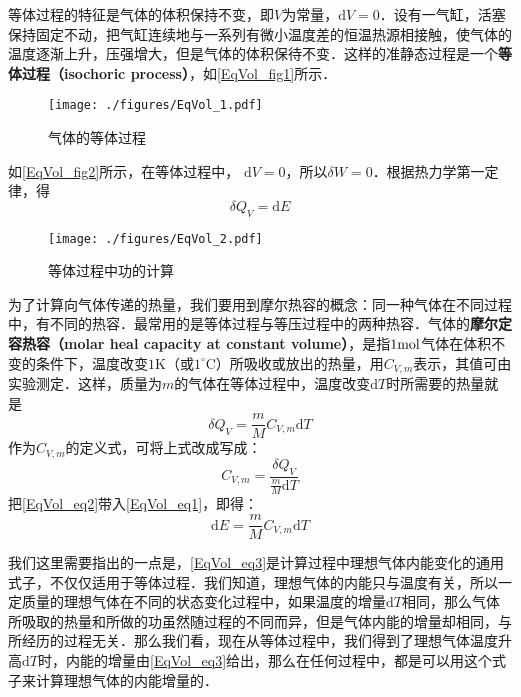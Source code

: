 

等体过程的特征是气体的体积保持不变，即$V $为常量，$\mathrm dV=0$．设有一气缸，活塞保持固定不动，把气缸连续地与一系列有微小温度差的恒温热源相接触，使气体的温度逐渐上升，压强增大，但是气体的体积保待不变．这样的准静态过程是一个\textbf{等体过程（isochoric process）}，如\autoref{EqVol_fig1}所示．
\begin{figure}[ht]
\centering
\texttt{[image: ./figures/EqVol\_1.pdf]}
\caption{气体的等体过程} \label{EqVol_fig1}
\end{figure}
如\autoref{EqVol_fig2}所示，在等体过程中， $\mathrm dV=0$，所以$\delta W=0$．根据热力学第一定律，得
\begin{equation} \label{EqVol_eq1}
\delta Q_{V}=\mathrm{d} E
\end{equation}
\begin{figure}[ht]
\centering
\texttt{[image: ./figures/EqVol\_2.pdf]}
\caption{等体过程中功的计算} \label{EqVol_fig2}
\end{figure}
为了计算向气体传递的热量，我们要用到摩尔热容的概念：同一种气体在不同过程中，有不同的热容．最常用的是等体过程与等压过程中的两种热容．气体的\textbf{摩尔定容热容（molar heal capacity at constant volume）}，是指$1 \rm mol$气体在体积不变的条件下，温度改变$1\mathrm{K}$（或$1^\circ \mathrm{C}$）所吸收或放出的热量，用$C_{V,m}$表示，其值可由实验测定．这样，质量为$m $的气体在等体过程中，温度改变$\mathrm dT $时所需要的热量就是
\begin{equation} \label{EqVol_eq2}
\delta Q_{V}=\frac{m}{M} C_{V, {m}} \mathrm{d} T
\end{equation}
作为$C_{V,m}$的定义式，可将上式改成写成：
\begin{equation} 
C_{V, m}=\frac{\delta Q_{V}}{\frac{m}{M} \mathrm{d} T}
\end{equation}
把\autoref{EqVol_eq2}带入\autoref{EqVol_eq1}，即得：
\begin{equation} \label{EqVol_eq3}
\mathrm{d} E=\frac{m}{M} C_{V, m} \mathrm{d} T
\end{equation}

我们这里需要指出的一点是，\autoref{EqVol_eq3}是计算过程中理想气体内能变化的通用式子，不仅仅适用于等体过程．我们知道，理想气体的内能只与温度有关，所以一定质量的理想气体在不同的状态变化过程中，如果温度的增量$\mathrm dT $相同，那么气体所吸取的热量和所做的功虽然随过程的不同而异，但是气体内能的增量却相同，与所经历的过程无关．那么我们看，现在从等体过程中，我们得到了理想气体温度升高$\mathrm dT $时，内能的增量由\autoref{EqVol_eq3}给出，那么在任何过程中，都是可以用这个式子来计算理想气体的内能增量的．

